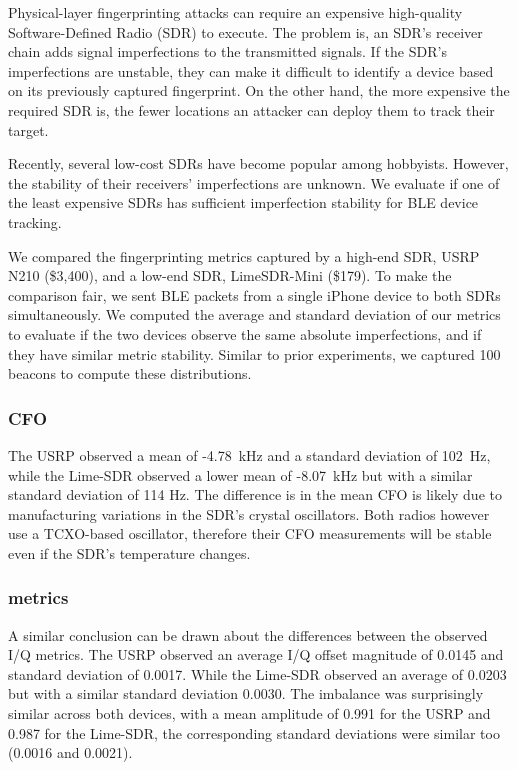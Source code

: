 Physical-layer fingerprinting attacks can require an expensive high-quality
Software-Defined Radio (SDR) to execute. The problem is, an SDR's receiver
chain adds signal imperfections to the transmitted signals. If the SDR's
imperfections are unstable, they can make it difficult to identify a device
based on its previously captured fingerprint. On the other hand, the more expensive the required SDR is, the fewer locations an attacker can
deploy them to track their target. 

Recently, several low-cost SDRs have
become popular among hobbyists. However, the stability of their receivers'
imperfections are unknown. We evaluate if one of the least expensive SDRs has
sufficient imperfection stability for BLE device tracking.

We compared the fingerprinting metrics captured by a high-end SDR, USRP N210 (\$3,400), and a low-end SDR, LimeSDR-Mini (\$179).
To make the comparison fair, we sent BLE packets from a single iPhone device to both SDRs simultaneously.
We computed the average and standard deviation of
our metrics to evaluate if the two devices observe the same absolute imperfections, and if they have similar metric stability.
Similar to prior experiments, we captured 100 beacons to compute these
distributions.

\subsubsection*{CFO} The USRP observed a mean of -4.78~kHz and a standard
deviation of 102~Hz, while the Lime-SDR observed a lower mean of -8.07~kHz
but with a similar standard deviation of 114 Hz. The difference is in the mean CFO is likely due
to manufacturing variations in the SDR's crystal oscillators. Both radios
however use a TCXO-based oscillator, therefore their CFO measurements will be stable even if the SDR's temperature changes.

\subsubsection*{\iq metrics} A similar conclusion can be drawn about the
differences between the observed I/Q metrics. The USRP observed an average I/Q
offset magnitude of 0.0145 and standard deviation of 0.0017. While the Lime-SDR
observed an average of 0.0203 but with a similar standard deviation 0.0030. 
The \iq imbalance was surprisingly similar across both devices, with a mean
amplitude of 0.991 for the USRP and 0.987 for the Lime-SDR, the corresponding standard deviations
were similar too (0.0016 and 0.0021).

